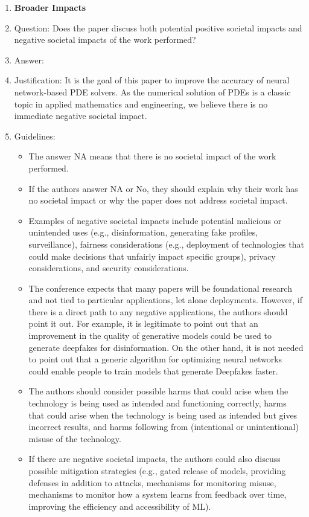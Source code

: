 \begin{enumerate}
\item {\bf Broader Impacts}
\item[] Question: Does the paper discuss both potential positive societal impacts and negative societal impacts of the work performed?
\item[] Answer: \answerNo{}
\item[] Justification:
  It is the goal of this paper to improve the accuracy of neural network-based PDE solvers. As the numerical solution of PDEs is a classic topic in applied mathematics and engineering, we believe there is no immediate negative societal impact.
\item[] Guidelines:
  \begin{itemize}
  \item The answer NA means that there is no societal impact of the work performed.
  \item If the authors answer NA or No, they should explain why their work has no societal impact or why the paper does not address societal impact.
  \item Examples of negative societal impacts include potential malicious or unintended uses (e.g., disinformation, generating fake profiles, surveillance), fairness considerations (e.g., deployment of technologies that could make decisions that unfairly impact specific groups), privacy considerations, and security considerations.
  \item The conference expects that many papers will be foundational research and not tied to particular applications, let alone deployments. However, if there is a direct path to any negative applications, the authors should point it out. For example, it is legitimate to point out that an improvement in the quality of generative models could be used to generate deepfakes for disinformation. On the other hand, it is not needed to point out that a generic algorithm for optimizing neural networks could enable people to train models that generate Deepfakes faster.
  \item The authors should consider possible harms that could arise when the technology is being used as intended and functioning correctly, harms that could arise when the technology is being used as intended but gives incorrect results, and harms following from (intentional or unintentional) misuse of the technology.
  \item If there are negative societal impacts, the authors could also discuss possible mitigation strategies (e.g., gated release of models, providing defenses in addition to attacks, mechanisms for monitoring misuse, mechanisms to monitor how a system learns from feedback over time, improving the efficiency and accessibility of ML).
  \end{itemize}


\end{enumerate}
